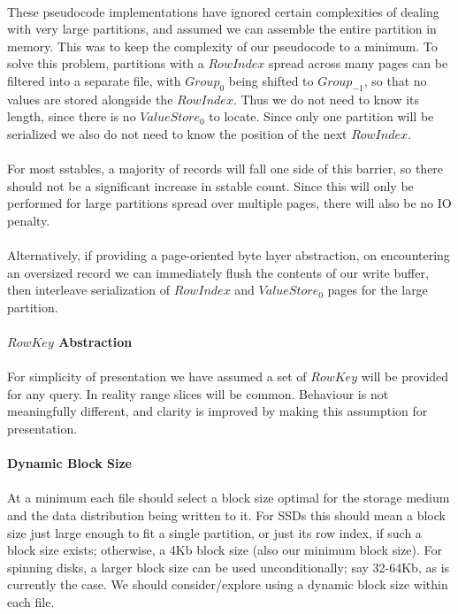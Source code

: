 \documentclass[fleqn]{article}
\begin{document}
\paragraph{}
    These pseudocode implementations have ignored certain complexities of dealing with very large
    partitions, and assumed we can assemble the entire partition in memory. This was to keep
    the complexity of our pseudocode to a minimum. To solve this problem, partitions with a $RowIndex$ 
    spread across many pages can be filtered into a separate file, with $Group_0$ being shifted to 
    $Group_{-1}$, so that no values are stored alongside the $RowIndex$. Thus we do not need to know 
    its length, since there is no $ValueStore_0$ to locate.
    Since only one partition will be serialized we also do not need to know the position of the next $RowIndex$.
    \\\\
    For most sstables, a majority of records will fall one side of this barrier, so there should not be a
    significant increase in sstable count. Since this will only be performed for large partitions spread over
    multiple pages, there will also be no IO penalty.
    \\\\
    Alternatively, if providing a page-oriented byte layer abstraction, on encountering an
    oversized record we can immediately flush the contents of our write buffer, then interleave 
    serialization of $RowIndex$ and $ValueStore_0$ pages for the large partition.
\paragraph{$RowKey$ Abstraction}
\paragraph{}
    For simplicity of presentation we have assumed a set of $RowKey$ will be provided for any query.
    In reality range slices will be common. Behaviour is not meaningfully different, and clarity 
    is improved by making this assumption for presentation.
\paragraph{Dynamic Block Size}
\paragraph{}
    At a minimum each file should select a block size optimal for the storage medium and the data distribution 
    being written to it. For SSDs this should mean a block size just large enough to fit a single partition, 
    or just its row index, if such a block size exists; otherwise, a 4Kb block size (also our minimum block size).
    For spinning disks, a larger block size can be used unconditionally; say 32-64Kb, as is currently the case.
    We should consider/explore using a dynamic block size within each file.
\end{document}
